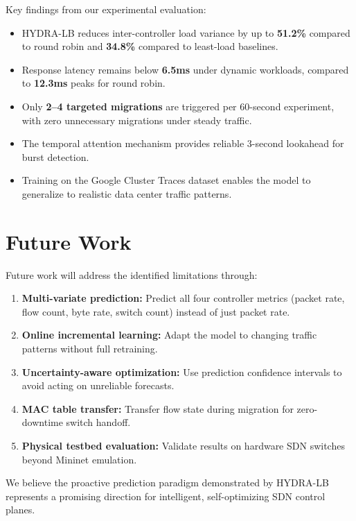 \documentclass[12pt,a4paper]{report}
\begin{document}
Key findings from our experimental evaluation:

\begin{itemize}
    \item HYDRA-LB reduces inter-controller load variance by up to \textbf{51.2\%} compared to round robin and \textbf{34.8\%} compared to least-load baselines.
    \item Response latency remains below \textbf{6.5ms} under dynamic workloads, compared to \textbf{12.3ms} peaks for round robin.
    \item Only \textbf{2--4 targeted migrations} are triggered per 60-second experiment, with zero unnecessary migrations under steady traffic.
    \item The temporal attention mechanism provides reliable 3-second lookahead for burst detection.
    \item Training on the Google Cluster Traces dataset enables the model to generalize to realistic data center traffic patterns.
\end{itemize}

\section{Future Work}

Future work will address the identified limitations through:

\begin{enumerate}
    \item \textbf{Multi-variate prediction:} Predict all four controller metrics (packet rate, flow count, byte rate, switch count) instead of just packet rate.
    \item \textbf{Online incremental learning:} Adapt the model to changing traffic patterns without full retraining.
    \item \textbf{Uncertainty-aware optimization:} Use prediction confidence intervals to avoid acting on unreliable forecasts.
    \item \textbf{MAC table transfer:} Transfer flow state during migration for zero-downtime switch handoff.
    \item \textbf{Physical testbed evaluation:} Validate results on hardware SDN switches beyond Mininet emulation.
\end{enumerate}

We believe the proactive prediction paradigm demonstrated by HYDRA-LB represents a promising direction for intelligent, self-optimizing SDN control planes.
\end{document}
